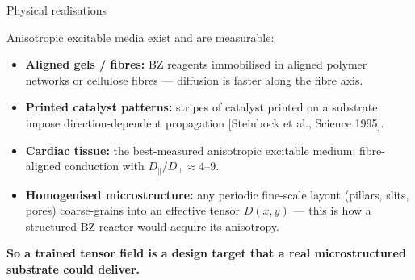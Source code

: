 \documentclass[aspectratio=169,11pt]{beamer}
\newcommand{\citeslide}[1]{\hfill{\footnotesize [#1]}}
\begin{document}
\begin{frame}{Physical realisations}

Anisotropic excitable media exist and are measurable:

\vspace{0.2cm}
\begin{itemize}
    \item \textbf{Aligned gels / fibres:} BZ reagents immobilised in aligned polymer networks or cellulose fibres --- diffusion is faster along the fibre axis.
    \item \textbf{Printed catalyst patterns:} stripes of catalyst printed on a substrate impose direction-dependent propagation \citeslide{Steinbock et al., Science 1995}.
    \item \textbf{Cardiac tissue:} the best-measured anisotropic excitable medium; fibre-aligned conduction with $D_\parallel / D_\perp \approx 4$--$9$.
    \item \textbf{Homogenised microstructure:} any periodic fine-scale layout (pillars, slits, pores) coarse-grains into an effective tensor $D(x,y)$ --- this is how a structured BZ reactor would acquire its anisotropy.
\end{itemize}

\vspace{0.3cm}
\centering
\textbf{So a trained tensor field is a design target that a real microstructured substrate could deliver.}

\end{frame}
\end{document}
